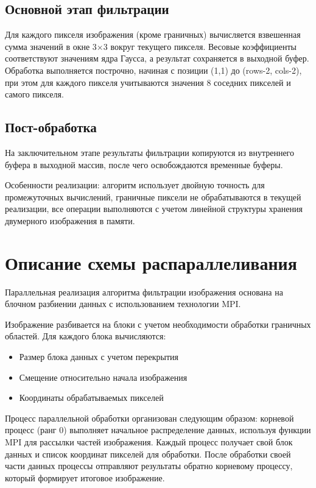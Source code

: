 \documentclass[14pt]{extarticle}
\theoremstyle{definition}
\theoremstyle{remark}
\begin{document}
\subsection{Основной этап фильтрации}

Для каждого пикселя изображения (кроме граничных) вычисляется взвешенная сумма значений в окне 3×3 вокруг текущего пикселя. Весовые коэффициенты соответствуют значениям ядра Гаусса, а результат сохраняется в выходной буфер. Обработка выполняется построчно, начиная с позиции (1,1) до (rows-2, cols-2), при этом для каждого пикселя учитываются значения 8 соседних пикселей и самого пикселя.

\subsection{Пост-обработка}
На заключительном этапе результаты фильтрации копируются из внутреннего буфера в выходной массив, после чего освобождаются временные буферы.

Особенности реализации: алгоритм использует двойную точность для промежуточных вычислений, граничные пиксели не обрабатываются в текущей реализации, все операции выполняются с учетом линейной структуры хранения двумерного изображения в памяти.
\clearpage
\section{Описание схемы распараллеливания}

Параллельная реализация алгоритма фильтрации изображения основана на блочном разбиении данных с использованием технологии MPI.

Изображение разбивается на блоки с учетом необходимости обработки граничных областей. Для каждого блока вычисляются:
\begin{itemize}
    \item Размер блока данных с учетом перекрытия
    \item Смещение относительно начала изображения
    \item Координаты обрабатываемых пикселей
\end{itemize}

Процесс параллельной обработки организован следующим образом: корневой процесс (ранг 0) выполняет начальное распределение данных, используя функции MPI для рассылки частей изображения. Каждый процесс получает свой блок данных и список координат пикселей для обработки. После обработки своей части данных процессы отправляют результаты обратно корневому процессу, который формирует итоговое изображение.
\end{document}

